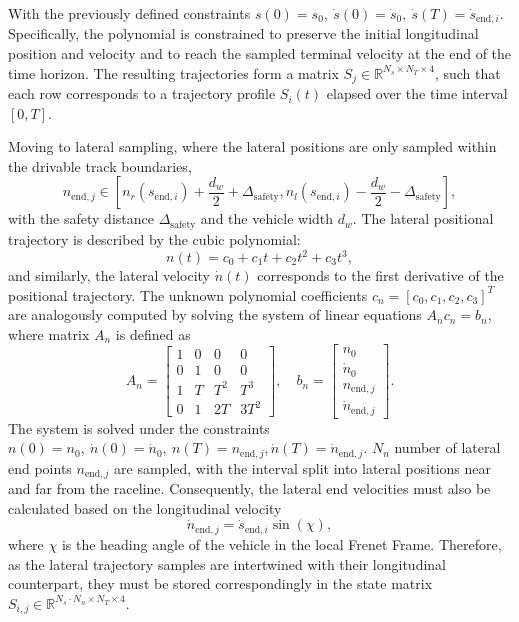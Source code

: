 With the previously defined constraints $s(0) = s_0, \ \dot{s}(0) = \dot{s}_0, \ \dot{s}(T) = \dot{s}_{\text{end},i}$.
Specifically, the polynomial is constrained to preserve the initial longitudinal position and velocity and to reach the sampled terminal velocity at the end of the time horizon.
The resulting trajectories form a matrix $S_j \in \mathbb{R}^{N_s \times N_T \times 4}$, such that each row corresponds to a trajectory profile $S_i(t)$ elapsed over the time interval $[0, T]$.

Moving to lateral sampling, where the lateral positions are only sampled within the drivable track boundaries,
\begin{equation}
    n_{\text{end},j} \in \left[n_r(s_{\text{end}, i}) + \frac{d_w}{2} + \Delta_{\text{safety}}, n_l(s_{\text{end}, i}) - \frac{d_w}{2} - \Delta_{\text{safety}}\right],
\end{equation}
with the safety distance $\Delta_{\text{safety}}$ and the vehicle width $d_w$. The lateral positional trajectory is described by the cubic polynomial:
\begin{equation}
    n(t) = c_0 + c_1 t + c_2 t^2 + c_3 t^3,
\end{equation}
and similarly, the lateral velocity $\dot{n}(t)$ corresponds to the first derivative of the positional trajectory.
The unknown polynomial coefficients $c_n = [c_0, c_1, c_2, c_3]^T$ are analogously computed by solving the system of linear equations $A_n c_n = b_n$, where matrix $A_n$ is defined as
\begin{equation}
    A_n = \begin{bmatrix}
        1 & 0 & 0 & 0\\
        0 & 1 & 0 & 0\\
        1 & T & T^2 & T^3\\
        0 & 1 & 2T & 3T^2
    \end{bmatrix}, \quad
    b_n = \begin{bmatrix}
        n_0 \\
        \dot{n}_0\\
        n_{\text{end}, j} \\
        \dot{n}_{\text{end}, j}
    \end{bmatrix}.
\end{equation}
The system is solved under the constraints $n(0) = n_0, \ \dot{n}(0) = \dot{n}_0 , \ n(T) = n_{\text{end}, j}, \dot{n}(T) = \dot{n}_{\text{end}, j}$.
$N_n$ number of lateral end points $n_{\text{end}, j}$ are sampled, with the interval split into lateral positions near and far from the raceline.
Consequently, the lateral end velocities must also be calculated based on the longitudinal velocity
\begin{equation}
    \dot{n}_{\text{end}, j} = \dot{s}_{\text{end}, i} \sin (\chi),
\end{equation}
where $\chi$ is the heading angle of the vehicle in the local Frenet Frame.
Therefore, as the lateral trajectory samples are intertwined with their longitudinal counterpart, they must be stored correspondingly in the state matrix $S_{i,j} \in \mathbb{R}^{N_s \cdot N_n \times N_T \times 4}$.

